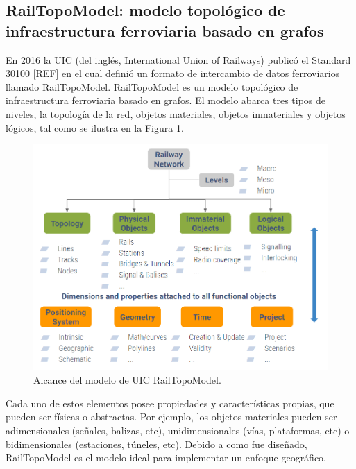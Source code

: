 \subsection{RailTopoModel: modelo topológico de infraestructura ferroviaria basado en grafos}

    En 2016 la UIC (del inglés, International Union of Railways) publicó el Standard 30100 [REF] en el cual definió un formato de intercambio de datos ferroviarios llamado RailTopoModel. RailTopoModel es un modelo topológico de infraestructura ferroviaria basado en grafos. El modelo abarca tres tipos de niveles, la topología de la red, objetos materiales, objetos inmateriales y objetos lógicos, tal como se ilustra en la Figura \ref{fig:RTM_3}. 

    \begin{figure}[!h]
        \centering
        \includegraphics[width=1\textwidth]{Figuras/objetos}
        \centering\caption{Alcance del modelo de UIC RailTopoModel.}
        \label{fig:RTM_3}
    \end{figure}

    Cada uno de estos elementos posee propiedades y características propias, que pueden ser físicas o abstractas. Por ejemplo, los objetos materiales pueden ser adimensionales (señales, balizas, etc), unidimensionales (vías, plataformas, etc) o bidimensionales (estaciones, túneles, etc). Debido a como fue diseñado, RailTopoModel es el modelo ideal para implementar un enfoque geográfico.
    




